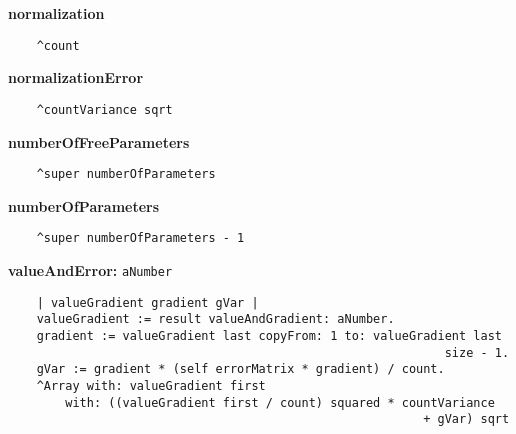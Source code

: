{\bf normalization}
\begin{verbatim}
    ^count

\end{verbatim}
{\bf normalizationError}
\begin{verbatim}
    ^countVariance sqrt

\end{verbatim}
{\bf numberOfFreeParameters}
\begin{verbatim}
    ^super numberOfParameters

\end{verbatim}
{\bf numberOfParameters}
\begin{verbatim}
    ^super numberOfParameters - 1

\end{verbatim}
{\bf valueAndError:} {\tt aNumber}
\begin{verbatim}
    | valueGradient gradient gVar |
    valueGradient := result valueAndGradient: aNumber.
    gradient := valueGradient last copyFrom: 1 to: valueGradient last 
                                                             size - 1.
    gVar := gradient * (self errorMatrix * gradient) / count.
    ^Array with: valueGradient first
        with: ((valueGradient first / count) squared * countVariance 
                                                          + gVar) sqrt

\end{verbatim}

